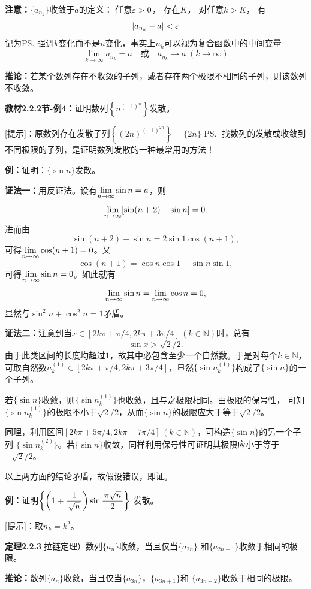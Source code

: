 {\bf 注意：}{\b$\{a_{n_k}\}$收敛于$a$的定义： 任意$\varepsilon>0$， 存在${K}$，
对任意$k>K$， 有
$$|a_{{{n_k}}}-a|<\varepsilon$$
 记为\ps{强调$k$变化而不是$n$变化，事实上$n_k$可以视为复合函数中的中间变量}
$$\lim\limits_{{k\to\infty}}a_{n_k}=a\quad \mbox{或}\quad a_{n_k}\to
a\;{(k\to\infty)}$$}

{\bf 推论：}若某个数列存在不收敛的子列，或者存在两个极限不相同的子列，则该数列不收敛。

{\bf 教材2.2.2节-例4：}证明数列$\left\{n^{(-1)^n}\right\}$发散。

[提示]：原数列存在发散子列$\left\{(2n)^{(-1)^{2n}}\right\}=\{2n\}$
\ps{\b 寻找数列的发散或收敛到不同极限的子列，是证明数列发散的一种最常用的方法！}

\begin{shaded}
	{\bf 例：}证明：$\{\sin n\}$发散。
	
	{\bf 证法一：}用反证法。设有$\lim\limits_{n\to\infty}\sin n=a$，则
	$$\lim\limits_{n\to\infty}[\sin(n+2)-\sin n]=0.$$
	进而由
	$$\sin(n+2)-\sin n=2\sin 1\cos(n+1),$$
	可得$\lim\limits_{n\to\infty}\cos(n+1)=0$。又
	$$\cos(n+1)=\cos n\cos 1-\sin n\sin 1,$$
	可得$\lim\limits_{n\to\infty}\sin n=0$。如此就有
	$$\lim\limits_{n\to\infty}\sin n=\lim\limits_{n\to\infty}\cos n=0,$$
	显然与$\sin^2n+\cos^2n=1$矛盾。
	
	{\bf 证法二：}注意到当$x\in[2k\pi+\pi/4,2k\pi+3\pi/4]\,(k\in\mathbb{N})$时，总有
	$$\sin x>\sqrt2/2.$$
	由于此类区间的长度均超过$1$，故其中必包含至少一个自然数。于是对每个$k\in\mathbb{N}$，
	可取自然数$n^{(1)}_k\in[2k\pi+\pi/4,2k\pi+3\pi/4]$，显然$\{\sin{n^{(1)}_k}\}$构成了$\{\sin
	n\}$的一个子列。
	
	若$\{\sin n\}$收敛，则$\{\sin{n^{(1)}_k}\}$也收敛，且与之极限相同。由极限的保号性，
	可知$\{\sin{n^{(1)}_k}\}$的极限不小于$\sqrt2/2$，从而$\{\sin
	n\}$的极限应大于等于$\sqrt2/2$。
	
	同理，利用区间$[2k\pi+5\pi/4,2k\pi+7\pi/4]\,(k\in\mathbb{N})$，可构造$\{\sin
	n\}$的另一个子列 $\{\sin{n^{(2)}_k}\}$。若$\{\sin n\}$收敛，同样利用保号性可证明其极限应小于等于$-\sqrt2/2$。
	
	
	以上两方面的结论矛盾，故假设错误，即证。
\end{shaded}

{\bf 例：}证明$\left\{\left(1+\displaystyle\frac{\,{1}\,}{\,{\sqrt n}\,}\right)\sin\displaystyle\frac{\,{\pi\sqrt n}\,}{\,{2}\,}\right\}$
发散。

[提示]：取$n_k=k^2$。 

\bigskip

{\bf 定理2.2.3}{\b（拉链定理）数列$\{a_n\}$收敛，当且仅当$\{a_{2n}\}$
和$\{a_{2n-1}\}$收敛于相同的极限。}

{\bf 推论：}数列$\{a_n\}$收敛，当且仅当$\{a_{3n}\}$，$\{a_{3n+1}\}$和
$\{a_{3n+2}\}$收敛于相同的极限。

